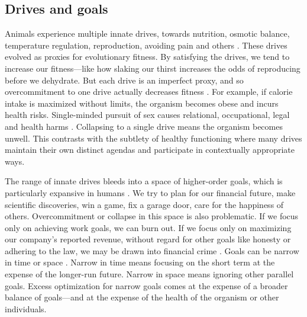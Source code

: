 \documentclass[12pt]{article}
\begin{document}
\subsection{Drives and goals}


Animals experience multiple innate drives, towards nutrition, osmotic balance, temperature regulation, reproduction, avoiding pain and others \citep{saper2014hypothalamus, schulkin2019allostasis, sewards2003representations}. These drives evolved as proxies for evolutionary fitness. By satisfying the drives, we tend to increase our fitness---like how slaking our thirst increases the odds of reproducing before we dehydrate. But each drive is an imperfect proxy, and so overcommitment to one drive actually decreases fitness \citep{kurthnelson2024dynamic,john2023dead, williams1966adaptation, tooby1992psychological}. For example, if calorie intake is maximized without limits, the organism becomes obese and incurs health risks. Single-minded pursuit of sex causes relational, occupational, legal and health harms \citep{kraus2016should, carnes2001out}. Collapsing to a single drive means the organism becomes unwell. This contrasts with the subtlety of healthy functioning where many drives maintain their own distinct agendas and participate in contextually appropriate ways.

The range of innate drives bleeds into a space of higher-order goals, which is particularly expansive in humans \citep{maslow1943theory, miller1960plans, miller2001integrative, vallacher1987people, balleine2007role, cardinal2002emotion, frank2006anatomy, saunders2012role, o2014goal, schank1977scripts}. We try to plan for our financial future, make scientific discoveries, win a game, fix a garage door, care for the happiness of others. Overcommitment or collapse in this space is also problematic. If we focus only on achieving work goals, we can burn out. If we focus only on maximizing our company's reported revenue, without regard for other goals like honesty or adhering to the law, we may be drawn into financial crime \citep{campbell1979assessing, ordonez2009goals, kerr1975folly, burns2006impact}. Goals can be narrow in time or space \citep{ballard2018pursuit, vallacher1987people, shah2002forgetting, evenden1999varieties}. Narrow in time means focusing on the short term at the expense of the longer-run future. Narrow in space means ignoring other parallel goals. Excess optimization for narrow goals comes at the expense of a broader balance of goals---and at the expense of the health of the organism or other individuals.
\end{document}
